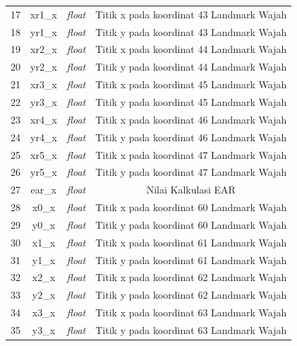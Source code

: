 \begin{longtable}{|c|c|c|c|}
  17          & xr1\_x              & \textit{float}     & Titik x pada koordinat 43 Landmark Wajah \\
  18          & yr1\_x              & \textit{float}     & Titik y pada koordinat 43 Landmark Wajah \\
  19          & xr2\_x              & \textit{float}     & Titik x pada koordinat 44 Landmark Wajah \\
  20          & yr2\_x              & \textit{float}     & Titik y pada koordinat 44 Landmark Wajah \\
  21          & xr3\_x              & \textit{float}     & Titik x pada koordinat 45 Landmark Wajah \\
  22          & yr3\_x              & \textit{float}     & Titik y pada koordinat 45 Landmark Wajah \\
  23          & xr4\_x              & \textit{float}     & Titik x pada koordinat 46 Landmark Wajah \\
  24          & yr4\_x              & \textit{float}     & Titik y pada koordinat 46 Landmark Wajah \\
  25          & xr5\_x              & \textit{float}     & Titik x pada koordinat 47 Landmark Wajah \\
  26          & yr5\_x              & \textit{float}     & Titik y pada koordinat 47 Landmark Wajah \\
  27          & ear\_x              & \textit{float}     & Nilai Kalkulasi EAR                      \\
  28          & x0\_x               & \textit{float}     & Titik x pada koordinat 60 Landmark Wajah \\
  29          & y0\_x               & \textit{float}     & Titik y pada koordinat 60 Landmark Wajah \\
  30          & x1\_x               & \textit{float}     & Titik x pada koordinat 61 Landmark Wajah \\
  31          & y1\_x               & \textit{float}     & Titik y pada koordinat 61 Landmark Wajah \\
  32          & x2\_x               & \textit{float}     & Titik x pada koordinat 62 Landmark Wajah \\
  33          & y2\_x               & \textit{float}     & Titik y pada koordinat 62 Landmark Wajah \\
  34          & x3\_x               & \textit{float}     & Titik x pada koordinat 63 Landmark Wajah \\
  35          & y3\_x               & \textit{float}     & Titik y pada koordinat 63 Landmark Wajah \\

\end{longtable}
